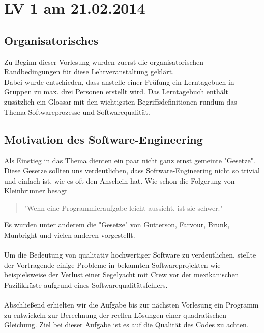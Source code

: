 \chapter{LV 1 am 21.02.2014}
\section{Organisatorisches}
Zu Beginn dieser Vorlesung wurden zuerst die organisatorischen Randbedingungen für diese Lehrveranstaltung geklärt.\\
Dabei wurde entschieden, dass anstelle einer Prüfung ein Lerntagebuch in Gruppen zu max. drei Personen erstellt wird. Das Lerntagebuch enthält zusätzlich ein Glossar mit den wichtigsten Begriffsdefinitionen rundum das Thema Softwareprozesse und Softwarequalität.

\section{Motivation des Software-Engineering}
Als Einstieg in das Thema dienten ein paar nicht ganz ernst gemeinte "Gesetze". Diese Gesetze sollten uns verdeutlichen, dass Software-Engineering nicht so trivial und einfach ist, wie es oft den Anschein hat. Wie schon die Folgerung von Kleinbrunner besagt
\begin{quote}
"Wenn eine Programmieraufgabe leicht aussieht, ist sie schwer."
\end{quote}
Es wurden unter anderem die "Gesetze" von Gutterson, Farvour, Brunk, Munbright und vielen anderen vorgestellt.
\\\\
Um die Bedeutung von qualitativ hochwertiger Software zu verdeutlichen, stellte der Vortragende einige Probleme in bekannten Softwareprojekten wie beispielsweise der Verlust einer Segelyacht mit Crew vor der mexikanischen Pazifikküste aufgrund eines Softwarequalitätsfehlers.
\\\\
Abschließend erhielten wir die Aufgabe bis zur nächsten Vorlesung ein Programm zu entwickeln zur Berechnung der reellen Lösungen einer quadratischen Gleichung. Ziel bei dieser Aufgabe ist es auf die Qualität des Codes zu achten. 